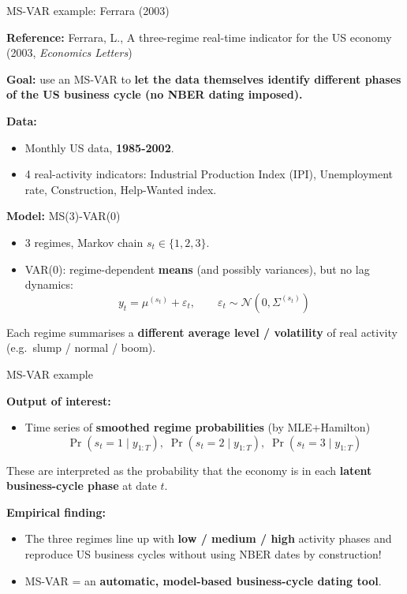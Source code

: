 \documentclass{beamer}
\begin{document}
\begin{frame}{MS-VAR example: Ferrara (2003)}
\small

\textbf{Reference:} Ferrara, L., A three-regime real-time indicator for the US economy (2003, \textit{Economics Letters})

\medskip
\textbf{Goal:} use an MS-VAR to \textbf{let the data themselves identify different phases of the US business cycle (no NBER dating imposed).}

\medskip
\textbf{Data:}
\begin{itemize}
  \item Monthly US data, \textbf{1985-2002}.
  \item 4 real-activity indicators: Industrial Production Index (IPI), Unemployment rate, Construction, Help-Wanted index.
        \end{itemize}

\medskip

\textbf{Model:} MS(3)-VAR(0)
\begin{itemize}
  \item 3 regimes, Markov chain $s_t \in \{1,2,3\}$.
  \item VAR(0): regime-dependent \textbf{means} (and possibly variances), but no lag dynamics:
        \[
          y_t = \mu^{(s_t)} + \varepsilon_t, 
          \qquad \varepsilon_t \sim \mathcal{N}(0,\Sigma^{(s_t)})
        \]
        \end{itemize}
 Each regime summarises a \textbf{different average level / volatility}
        of real activity (e.g.\ slump / normal / boom).


\end{frame}


\begin{frame}{MS-VAR example}


\textbf{Output of interest:}
\begin{itemize}
  \item Time series of \textbf{smoothed regime probabilities} (by MLE+Hamilton)
        \[
          \Pr(s_t = 1 \mid y_{1:T}),\;
          \Pr(s_t = 2 \mid y_{1:T}),\;
          \Pr(s_t = 3 \mid y_{1:T})
        \]
        \end{itemize}
These are interpreted as the probability that the economy is in
        each \textbf{latent business-cycle phase} at date $t$.


\medskip

\textbf{Empirical finding:}
\begin{itemize}
  \item The three regimes line up with \textbf{low / medium / high} activity phases and reproduce US business cycles without using NBER dates by construction!
  \item MS-VAR = an \textbf{automatic, model-based business-cycle dating tool}.
\end{itemize}


\end{frame}
\end{document}
